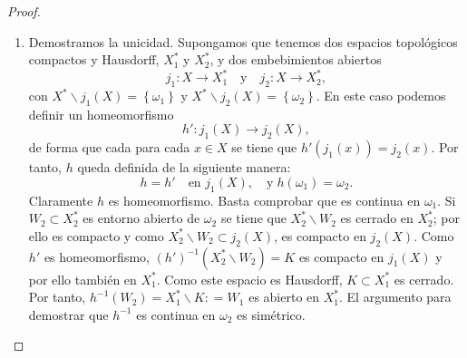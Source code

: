 \begin{proof}
\begin{enumerate}
Finalmente, consideremos la inclusión $\displaystyle j : X \to X^{*} $ con $\displaystyle j\left(x\right)=x $ para cada $\displaystyle x \in X $. Claramente es inyectiva y abierta. Además, es continua. En efecto,
si $\displaystyle W $ es abierto de $\displaystyle X^{*} $ y es de tipo 1 tenemos que $\displaystyle j^{-1}\left(W\right)=W $. Si $\displaystyle W $ es de tipo 2 tenemos que $\displaystyle W = X^{*}\backslash K $ y $\displaystyle j^{-1}\left(W\right)=X\backslash K $ que es abierto. Concluimos que $\displaystyle j $ es un embebimiento abierto. \\
De lo anterior, sabemos que $\displaystyle j\left(X\right) $ es un abierto en $\displaystyle X^{*} $. Veamos que es denso. Dado $\displaystyle U\subset X^{*} $ abierto no vacío, si es de tipo 1 se sigue que $\displaystyle U\subset j\left(X\right) $; si es de tipo 2, $\displaystyle X^{*}\backslash U $ es compacto en $\displaystyle j\left(X\right) $ por lo que no puede coincidir con $\displaystyle j\left(X\right) $ puesto que $\displaystyle j\left(X\right) $ no es compacto.
\item Demostramos la unicidad. Supongamos que tenemos dos espacios topológicos compactos y Hausdorff, $\displaystyle X_{1}^{*} $ y $\displaystyle X_{2}^{*} $, y dos embebimientos abiertos
	\[j_{1}: X \to X_{1}^{*} \quad \text{y} \quad j_{2}:X\to X_{2}^{*} ,\]
	con $\displaystyle X^{*}\backslash j_{1}\left(X\right)= \left\{ \omega _{1}\right\}  $ y $\displaystyle X^{*}\backslash j_{2}\left(X\right)= \left\{ \omega_{2}\right\}  $. En este caso podemos definir un homeomorfismo
	\[h' : j_{1}\left(X\right)\to j_{2}\left(X\right) ,\]
	de forma que cada para cada $\displaystyle x \in X $ se tiene que $\displaystyle h'\left(j_{1}\left(x\right)\right)=j_{2}\left(x\right) $. Por tanto, $\displaystyle h $ queda definida de la siguiente manera:
	\[h = h' \quad \text{en }j_{1}\left(X\right), \quad \text{y}\; h\left(\omega_{1}\right)=\omega_{2} .\]
Claramente $\displaystyle h $ es homeomorfismo. Basta comprobar que es continua en $\displaystyle \omega_{1} $. Si $\displaystyle W_{2}\subset X^{*}_{2} $ es entorno abierto de $\displaystyle \omega_{2} $ se tiene que $\displaystyle X_{2}^{*}\backslash W_{2} $ es cerrado en $\displaystyle X^{*}_{2} $; por ello es compacto y como $\displaystyle X^{*}_{2}\backslash W_{2}\subset j_{2}\left(X\right) $, es compacto en $\displaystyle j_{2}\left(X\right) $. 
Como $\displaystyle h' $ es homeomorfismo, $\displaystyle \left(h'\right)^{-1}\left(X^{*}_{2}\backslash W_{2}\right)=K $ es compacto en $\displaystyle j_{1}\left(X\right) $ y por ello también en $\displaystyle X_{1}^{*} $. Como este espacio es Hausdorff, $\displaystyle K\subset X^{*}_{1} $ es cerrado. Por tanto, $\displaystyle h^{-1}\left(W_{2}\right)=X^{*}_{1}\backslash K : = W_{1} $ es abierto en $\displaystyle X^{*}_{1} $. 
El argumento para demostrar que $\displaystyle h^{-1} $ es continua en $\displaystyle \omega_{2} $ es simétrico.
\end{enumerate}
\end{proof}
